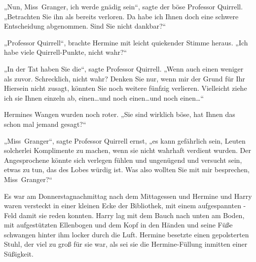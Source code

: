 „Nun, Miss~Granger, ich werde gnädig sein“, sagte der böse Professor Quirrell. „Betrachten Sie ihn als bereits verloren. Da habe ich Ihnen doch eine schwere Entscheidung abgenommen. Sind Sie nicht dankbar?“

„Professor Quirrell“, brachte Hermine mit leicht quiekender Stimme heraus. „Ich habe viele Quirrell-Punkte, nicht wahr?“

„In der Tat haben Sie die“, sagte Professor Quirrell. „Wenn auch einen weniger als zuvor. Schrecklich, nicht wahr? Denken Sie nur, wenn mir der Grund für Ihr Hiersein nicht zusagt, könnten Sie noch weitere fünfzig verlieren. Vielleicht ziehe ich sie Ihnen einzeln ab, einen…und noch einen…und noch einen…“

Hermines Wangen wurden noch roter. „Sie sind wirklich böse, hat Ihnen das schon mal jemand gesagt?“

„Miss~Granger“, sagte Professor Quirrell ernst, „es kann gefährlich sein, Leuten solcherlei Komplimente zu machen, wenn sie nicht wahrhaft verdient wurden. Der Angesprochene könnte sich verlegen fühlen und ungenügend und versucht sein, etwas zu tun, das des Lobes würdig ist. Was also wollten Sie mit mir besprechen, Miss~Granger?“

\later

Es war am Donnerstagnachmittag nach dem Mittagessen und Hermine und Harry waren versteckt in einer kleinen Ecke der Bibliothek, mit einem aufgespannten -Feld damit sie reden konnten. Harry lag mit dem Bauch nach unten am Boden, mit aufgestützten Ellenbogen und dem Kopf in den Händen und seine Füße schwangen hinter ihm locker durch die Luft. Hermine besetzte einen gepolsterten Stuhl, der viel zu groß für sie war, als sei sie die Hermine-Füllung inmitten einer Süßigkeit.

